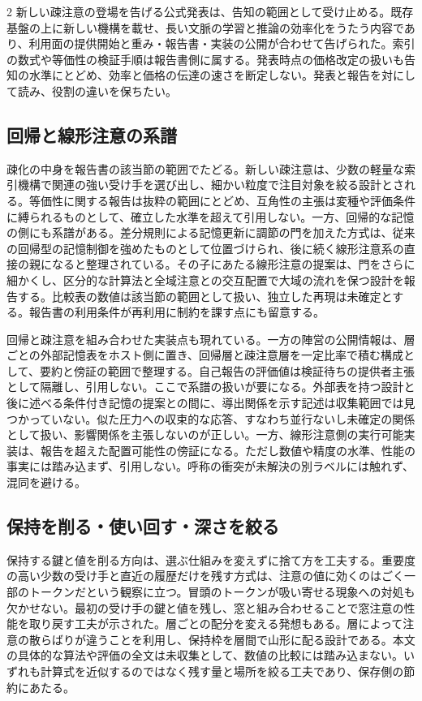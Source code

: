 \documentclass[lualatex,a4paper,10pt]{jlreq}
\begin{document}
\begin{multicols}{2}
新しい疎注意の登場を告げる公式発表は、告知の範囲として受け止める\autocite{dsaexp}。既存基盤の上に新しい機構を載せ、長い文脈の学習と推論の効率化をうたう内容であり、利用面の提供開始と重み・報告書・実装の公開が合わせて告げられた。索引の数式や等価性の検証手順は報告書側に属する\autocite{v32report}。発表時点の価格改定の扱いも告知の水準にとどめ、効率と価格の伝達の速さを断定しない。発表と報告を対にして読み、役割の違いを保ちたい。

\subsection{回帰と線形注意の系譜}
疎化の中身を報告書の該当節の範囲でたどる。新しい疎注意は、少数の軽量な索引機構で関連の強い受け手を選び出し、細かい粒度で注目対象を絞る設計とされる。等価性に関する報告は抜粋の範囲にとどめ、互角性の主張は変種や評価条件に縛られるものとして、確立した水準を超えて引用しない。一方、回帰的な記憶の側にも系譜がある。差分規則による記憶更新に調節の門を加えた方式は、従来の回帰型の記憶制御を強めたものとして位置づけられ、後に続く線形注意系の直接の親になると整理されている\autocite{gdn}。その子にあたる線形注意の提案は、門をさらに細かくし、区分的な計算法と全域注意との交互配置で大域の流れを保つ設計を報告する\autocite{kimilinear}。比較表の数値は該当節の範囲として扱い、独立した再現は未確定とする。報告書の利用条件が再利用に制約を課す点にも留意する。

回帰と疎注意を組み合わせた実装点も現れている。一方の陣営の公開情報は、層ごとの外部記憶表をホスト側に置き、回帰層と疎注意層を一定比率で積む構成として、要約と傍証の範囲で整理する\autocite{qwenreadme}。自己報告の評価値は検証待ちの提供者主張として隔離し、引用しない。ここで系譜の扱いが要になる。外部表を持つ設計と後に述べる条件付き記憶の提案との間に、導出関係を示す記述は収集範囲では見つかっていない\autocite{qwenlineage}。似た圧力への収束的な応答、すなわち並行ないし未確定の関係として扱い、影響関係を主張しないのが正しい。一方、線形注意側の実行可能実装は、報告を超えた配置可能性の傍証になる\autocite{kda}。ただし数値や精度の水準、性能の事実には踏み込まず、引用しない。呼称の衝突が未解決の別ラベルには触れず、混同を避ける。

\subsection{保持を削る・使い回す・深さを絞る}
保持する鍵と値を削る方向は、選ぶ仕組みを変えずに捨て方を工夫する。重要度の高い少数の受け手と直近の履歴だけを残す方式は、注意の値に効くのはごく一部のトークンだという観察に立つ\autocite{h2o}。冒頭のトークンが吸い寄せる現象への対処も欠かせない。最初の受け手の鍵と値を残し、窓と組み合わせることで窓注意の性能を取り戻す工夫が示された\autocite{sinks}。層ごとの配分を変える発想もある。層によって注意の散らばりが違うことを利用し、保持枠を層間で山形に配る設計である\autocite{pyramidkv}。本文の具体的な算法や評価の全文は未収集として、数値の比較には踏み込まない。いずれも計算式を近似するのではなく残す量と場所を絞る工夫であり、保存側の節約にあたる。


\end{multicols}
\end{document}
